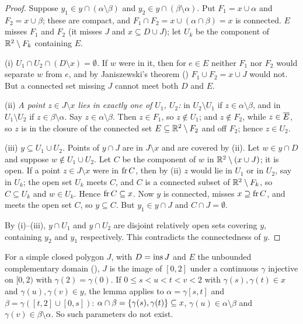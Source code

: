 \begin{proof}
Suppose $y_1\in y\cap(\alpha\setminus\beta)$ and $y_2\in y\cap(\beta\setminus\alpha)$. Put $F_1=x\cup\alpha$ and $F_2=x\cup\beta$;
these are compact, and $F_1\cap F_2=x\cup(\alpha\cap\beta)=x$ is connected. $E$ misses $F_1$ and $F_2$ (it misses $J$
and $x\subseteq D\cup J$); let $U_k$ be the component of $\mathbb{R}^2\setminus F_k$ containing $E$.

(i) \emph{$U_1\cap U_2\cap(D\setminus x)=\emptyset$.} If $w$ were in it, then for $e\in E$ neither $F_1$ nor $F_2$
would separate $w$ from $e$, and by Janiszewski's theorem () $F_1\cup F_2=x\cup J$ would not.
But a connected set missing $J$ cannot meet both $D$ and $E$.

(ii) \emph{A point $z\in J\setminus x$ lies in exactly one of $U_1$, $U_2$:} in $U_2\setminus U_1$ if $z\in\alpha\setminus\beta$,
and in $U_1\setminus U_2$ if $z\in\beta\setminus\alpha$. Say $z\in\alpha\setminus\beta$. Then $z\in F_1$, so $z\notin U_1$; and $z\notin
F_2$, while $z\in\overline{E}$, so $z$ is in the closure of the connected set $E\subseteq\mathbb{R}^2\setminus F_2$ and off $F_2$; hence
$z\in U_2$.

(iii) \emph{$y\subseteq U_1\cup U_2$.} Points of $y\cap J$ are in $J\setminus x$ and are covered by (ii). Let $w\in y\cap
D$ and suppose $w\notin U_1\cup U_2$. Let $C$ be the component of $w$ in $\mathbb{R}^2\setminus(x\cup J)$; it is open. If a
point $z\in J\setminus x$ were in $\operatorname{fr} C$, then by (ii) $z$ would lie in $U_1$ or in $U_2$, say in $U_k$; the open
set $U_k$ meets $C$, and $C$ is a connected subset of $\mathbb{R}^2\setminus F_k$, so $C\subseteq U_k$ and $w\in U_k$. Hence
$\operatorname{fr} C\subseteq x$. Now $y$ is connected, misses $x\supseteq\operatorname{fr} C$, and meets the open set $C$, so $y\subseteq C$. But
$y_1\in y\cap J$ and $C\cap J=\emptyset$.

By (i)--(iii), $y\cap U_1$ and $y\cap U_2$ are disjoint relatively open sets covering $y$, containing $y_2$ and $y_1$
respectively. This contradicts the connectedness of $y$.
\end{proof}


For a simple closed polygon $J$, with $D=\operatorname{ins} J$ and $E$ the unbounded complementary domain
(), $J$ is the image of $[0,2]$ under a continuous $\gamma$ injective on $[0,2)$ with
$\gamma(2)=\gamma(0)$. If $0\le s<u<t<v<2$ with $\gamma(s),\gamma(t)\in x$ and $\gamma(u),\gamma(v)\in y$, the lemma applies to
$\alpha=\gamma[s,t]$ and $\beta=\gamma([t,2]\cup[0,s])$: $\alpha\cap\beta=\left\{ \gamma(s),\gamma(t) \right\}\subseteq x$, $\gamma(u)\in\alpha\setminus\beta$
and $\gamma(v)\in\beta\setminus\alpha$. So such parameters do not exist.

